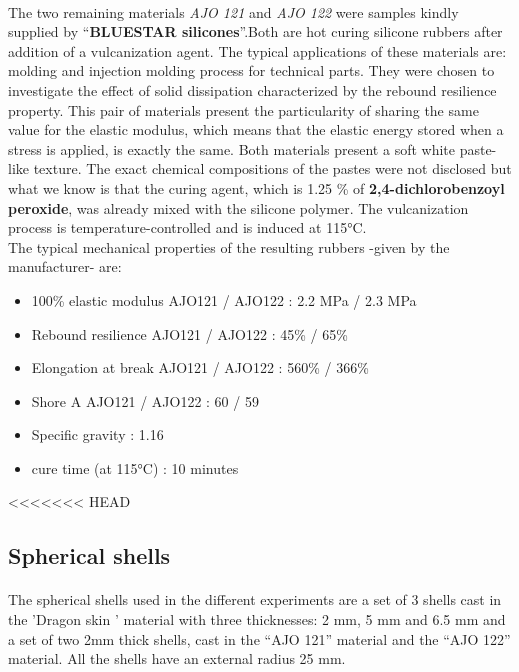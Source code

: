 \paragraph{}
The two remaining materials \emph{AJO 121} and \emph{AJO 122} were samples kindly supplied by "`\textbf{BLUESTAR silicones\textcopyright}"'.Both are hot curing silicone rubbers after addition of a vulcanization agent. The typical applications of these materials are: molding and injection molding process for technical parts. They were chosen to investigate the effect of solid dissipation characterized by the rebound resilience property. This pair of materials present the particularity of sharing the same value for the elastic modulus, which means that the elastic energy stored when a stress is applied, is exactly the same. Both materials present a soft white paste-like texture. The exact chemical compositions of the pastes were not disclosed but what we know is that the curing agent, which is 1.25 \% of \textbf{2,4-dichlorobenzoyl peroxide}, was already mixed with the silicone polymer. The vulcanization process is temperature-controlled and is induced at 115°C.\\

The typical mechanical properties of the resulting rubbers -given by the manufacturer- are:
\begin{itemize}
	\item 100\% elastic modulus AJO121 / AJO122 : 2.2 MPa / 2.3 MPa
	\item Rebound resilience AJO121 / AJO122 : 45\% / 65\%
	\item Elongation at break AJO121 / AJO122 : 560\% / 366\%
	\item Shore A AJO121 / AJO122 : 60 / 59 
	\item Specific gravity : 1.16
	\item cure time (at 115°C) : 10 minutes
\end{itemize}

<<<<<<< HEAD

\subsection{Spherical shells}
\label{sec:Spherical_shells}
\paragraph{}
The spherical shells used in the different experiments are a set of 3 shells cast in the 'Dragon skin ' material with three thicknesses: 2 mm, 5 mm and 6.5 mm and a set of two 2mm thick shells, cast in the "`AJO 121"' material and the "`AJO 122"' material. All the shells have an external radius 25 mm.

